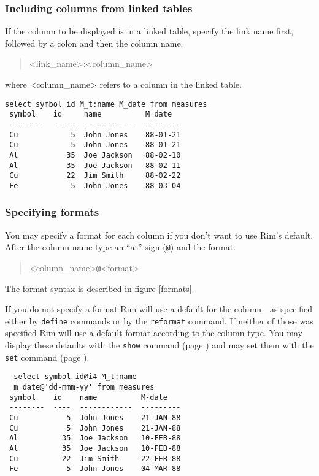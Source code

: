 \documentclass[11pt,a4paper]{report}
\begin{document}
\subsubsection{Including columns from linked tables}
%
If the column to be displayed is in a linked table, specify
the link name first, followed by a colon and then the column name.
\begin{verse}
<link\_name>:<column\_name>
\end{verse}
where <column\_name> refers to a column in the linked table.
 

 \begin{verbatim}
select symbol id M_t:name M_date from measures
 symbol    id     name          M_date
 --------  -----  ------------  --------
 Cu            5  John Jones    88-01-21
 Cu            5  John Jones    88-01-21
 Al           35  Joe Jackson   88-02-10
 Al           35  Joe Jackson   88-02-11
 Cu           22  Jim Smith     88-02-22
 Fe            5  John Jones    88-03-04
 \end{verbatim}
 
 
\subsubsection{Specifying formats}
\label{format-spec}
You may specify a format for each column if you don't want to use
Rim's default. After the column name type an ``at'' sign (\verb!@!) and the format.
\begin{verse}
<column\_name>\verb!@!<format>
\end{verse}
The format syntax is described in figure \ref{formats}.
 
 
If you do not specify a format Rim will use a default
for the column---as specified either by \verb!define! commands or by the
\verb!reformat! command.  If neither of those was specified Rim will
use a default format according to the column type.
You may display these defaults with the \verb!show! command (page \pageref{show})
and may set them with the \verb!set! command (page \pageref{set}).
 
\label{sel-dem1}
\begin{verbatim}
  select symbol id@i4 M_t:name
  m_date@'dd-mmm-yy' from measures
 symbol    id    name          M-date
 --------  ----  ------------  ---------
 Cu           5  John Jones    21-JAN-88
 Cu           5  John Jones    21-JAN-88
 Al          35  Joe Jackson   10-FEB-88
 Al          35  Joe Jackson   10-FEB-88
 Cu          22  Jim Smith     22-FEB-88
 Fe           5  John Jones    04-MAR-88
\end{verbatim}
 
\end{document}
